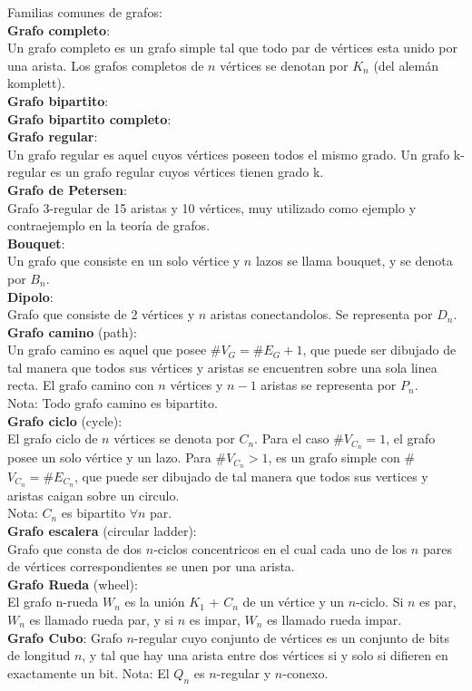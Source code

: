 \documentclass[a4paper,11pt]{report}
\begin{document}
\newpage
Familias comunes de grafos: \\
{\bf Grafo completo}: \\
Un grafo completo es un grafo simple tal que todo par de vértices esta unido por una arista. Los grafos completos de $n$ vértices se denotan por $K_n$ (del alemán komplett). \\
{\bf Grafo bipartito}: \\
{\bf Grafo bipartito completo}: \\
{\bf Grafo regular}: \\
Un grafo regular es aquel cuyos vértices poseen todos el mismo grado. Un grafo k-regular es un grafo regular cuyos vértices tienen grado k. \\
{\bf Grafo de Petersen}:\\
Grafo 3-regular de 15 aristas y 10 vértices, muy utilizado como ejemplo y contraejemplo en la teoría de grafos. \\
{\bf Bouquet}: \\
Un grafo que consiste en un solo vértice y $n$ lazos se llama bouquet, y se denota por $B_n$.\\
{\bf Dipolo}: \\
Grafo que consiste de 2 vértices y $n$ aristas conectandolos. Se representa por $D_n$.\\
{\bf Grafo camino} (path): \\
Un grafo camino es aquel que posee \#$V_G = \#E_G +1$, que puede ser dibujado de tal manera que todos sus vértices y aristas se encuentren sobre una sola linea recta. El grafo camino con $n$ vértices y $n-1$ aristas se representa por $P_n$.\\
Nota: Todo grafo camino es bipartito.\\
{\bf Grafo ciclo} (cycle):\\
El grafo ciclo de $n$ vértices se denota por $C_n$. Para el caso \#$V_{C_n}=1$, el grafo posee un solo vértice y un lazo. Para \#$V_{C_n}>1$, es un grafo simple con  \#$V_{C_n}=\#E_{C_n}$, que puede ser dibujado de tal manera que todos sus vertices y aristas caigan sobre un circulo. \\
Nota: $C_n$ es bipartito $\forall n$ par. \\
{\bf Grafo escalera} (circular ladder):\\
Grafo que consta de dos $n$-ciclos concentricos en el cual cada uno de los $n$ pares de vértices correspondientes se unen por una arista. \\
{\bf Grafo Rueda} (wheel):\\
El grafo n-rueda $W_n$ es la unión $K_1$ + $C_n$ de un vértice y un $n$-ciclo. Si $n$ es par, $W_n$ es llamado rueda par, y si $n$ es impar, $W_n$ es llamado rueda impar.\\
{\bf Grafo Cubo}:
Grafo $n$-regular cuyo conjunto de vértices es un conjunto de bits de longitud $n$, y tal que hay una arista entre dos vértices si y solo si difieren en exactamente un bit.
Nota: El $Q_n$ es $n$-regular y $n$-conexo.
\end{document}
